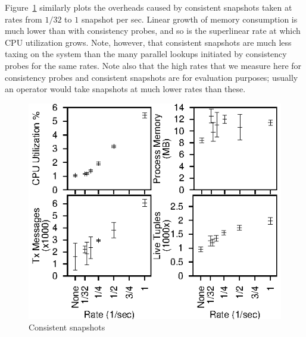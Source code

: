 \documentclass{sig-alt-full}
\begin{document}
Figure~\ref{fig:snapshots} similarly plots the overheads caused by
consistent snapshots taken at rates from $1/32$ to $1$ snapshot per sec.
Linear growth of memory consumption is much  lower than with consistency
probes, and so is the superlinear rate at which CPU utilization grows.
Note, however, that consistent snapshots are much less taxing on the
system than the many parallel lookups initiated by consistency probes
for the same rates. Note also that the high rates that we measure here for
consistency probes and consistent snapshots are
for evaluation purposes; usually an operator would take snapshots at
much lower rates than these.
\begin{figure}
\centerline{\includegraphics{newResults/snapshots}}
\caption{Consistent snapshots}
\label{fig:snapshots}
\end{figure}
\end{document}
